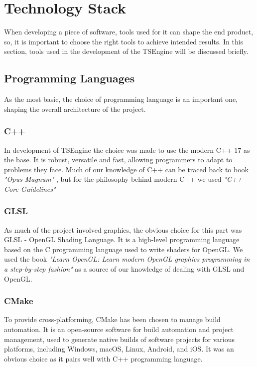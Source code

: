 \newpage
\section{Technology Stack}
\hspace{\parindent}
When developing a piece of software, tools used for it can shape the end product, so, it is important to choose the right tools to achieve intended results. In this section, tools used in the development of the TSEngine will be discussed briefly.

\subsection{Programming Languages}
\hspace{\parindent}
As the most basic, the choice of programming language is an important one, shaping the overall architecture of the project.
\subsubsection{C++}
\hspace{\parindent}
In development of TSEngine the choice was made to use the modern C++ 17 as the base. It is robust, versatile and fast, allowing programmers to adapt to problems they face. Much of our knowledge of C++ can be traced back to book \textit{"Opus Magnum"} \cite{OpusMagnum}, but for the philosophy behind modern C++ we used \textit{"C++ Core Guidelines"} \cite{CppCoreGuidelines}
\subsubsection{GLSL}
\hspace{\parindent}
\label{sec:glsl}
As much of the project involved graphics, the obvious choice for this part was GLSL - OpenGL Shading Language. It is a high-level programming language based on the C programming language used to write shaders for OpenGL. We used the book \textit{"Learn OpenGL: Learn modern OpenGL graphics programming in a step-by-step fashion"} \cite{learnopengl} as a source of our knowledge of dealing with GLSL and OpenGL.

\subsubsection{CMake}
\hspace{\parindent}
\label{sec:stack_cmake}
To provide cross-platforming, CMake has been chosen to manage build automation. It is an open-source software for build automation and project management, used to generate native builds of software projects for various platforms, including Windows, macOS, Linux, Android, and iOS. It was an obvious choice as it pairs well with C++ programming language.

